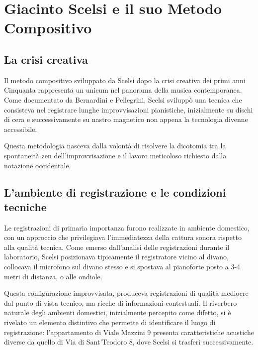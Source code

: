 
\section{Giacinto Scelsi e il suo Metodo Compositivo}
\subsection{La crisi creativa}
Il metodo compositivo sviluppato da Scelsi dopo la crisi creativa dei primi anni Cinquanta rappresenta un unicum nel panorama della musica contemporanea. Come documentato da Bernardini e Pellegrini, Scelsi sviluppò una tecnica che consisteva nel registrare lunghe improvvisazioni pianistiche, inizialmente su dischi di cera e successivamente su nastro magnetico non appena la tecnologia divenne accessibile\cite[p. 176]{Bernardini2012themul}.

Questa metodologia nasceva dalla volontà di risolvere la dicotomia tra la spontaneità zen dell'improvvisazione e il lavoro meticoloso richiesto dalla notazione occidentale.
\subsection{L'ambiente di registrazione e le condizioni tecniche}
Le registrazioni di primaria importanza furono realizzate in ambiente domestico, con un approccio che privilegiava l'immediatezza della cattura sonora rispetto alla qualità tecnica. Come emerso dall'analisi delle registrazioni durante il laboratorio, Scelsi posizionava tipicamente il registratore vicino al divano, collocava il microfono sul divano stesso e si spostava al pianoforte posto a 3-4 metri di distanza, o alle ondiole.

Questa configurazione improvvisata, produceva registrazioni di qualità mediocre dal punto di vista tecnico, ma ricche di informazioni contestuali. Il riverbero naturale degli ambienti domestici, inizialmente percepito come difetto, si è rivelato un elemento distintivo che permette di identificare il luogo di registrazione: l'appartamento di Viale Mazzini 9 presenta caratteristiche acustiche diverse da quello di Via di Sant'Teodoro 8, dove Scelsi si trasferì successivamente.
